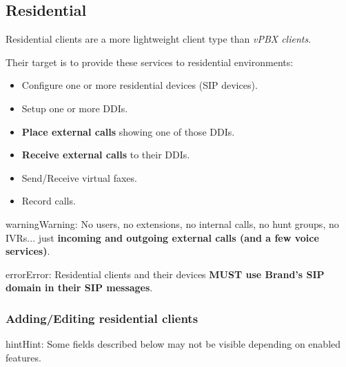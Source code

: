 \documentclass[letterpaper,10pt,english]{sphinxmanual}
\begin{document}
\subsection{Residential}
\label{administration_portal/brand/clients/residential:residential}\label{administration_portal/brand/clients/residential::doc}
Residential clients are a more lightweight client type than \emph{vPBX clients}.

Their target is to provide these services to residential environments:
\begin{itemize}
\item {} 
Configure one or more residential devices (SIP devices).

\item {} 
Setup one or more DDIs.

\item {} 
\textbf{Place external calls} showing one of those DDIs.

\item {} 
\textbf{Receive external calls} to their DDIs.

\item {} 
Send/Receive virtual faxes.

\item {} 
Record calls.

\end{itemize}

\begin{notice}{warning}{Warning:}
No users, no extensions, no internal calls, no hunt groups, no IVRs... just \textbf{incoming and outgoing external
calls (and a few voice services)}.
\end{notice}

\begin{notice}{error}{Error:}
Residential clients and their devices \textbf{MUST use Brand's SIP domain in their SIP messages}.
\end{notice}


\subsubsection{Adding/Editing residential clients}
\label{administration_portal/brand/clients/residential:adding-editing-residential-clients}
\begin{notice}{hint}{Hint:}
Some fields described below may not be visible depending on enabled features.
\end{notice}
\end{document}
